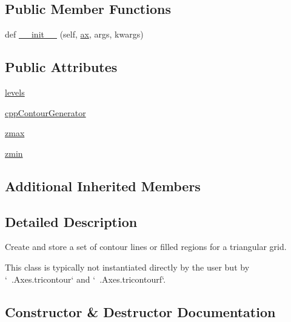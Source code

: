 \subsection*{Public Member Functions}
\begin{DoxyCompactItemize}
\item 
def \hyperlink{classmatplotlib_1_1tri_1_1tricontour_1_1TriContourSet_ade51194772697dd33f8fb16ee7f139f5}{\+\_\+\+\_\+init\+\_\+\+\_\+} (self, \hyperlink{classmatplotlib_1_1contour_1_1ContourSet_a3ae8b3ea504582cfb2b66cc79b932203}{ax}, args, kwargs)
\end{DoxyCompactItemize}
\subsection*{Public Attributes}
\begin{DoxyCompactItemize}
\item 
\hyperlink{classmatplotlib_1_1tri_1_1tricontour_1_1TriContourSet_aaf2cfa8111922a91fbd9c8879c038490}{levels}
\item 
\hyperlink{classmatplotlib_1_1tri_1_1tricontour_1_1TriContourSet_ac7276a16e6f34ebfb5ed63aacec64644}{cpp\+Contour\+Generator}
\item 
\hyperlink{classmatplotlib_1_1tri_1_1tricontour_1_1TriContourSet_afadab997a75ccc2364c967698c62c5f4}{zmax}
\item 
\hyperlink{classmatplotlib_1_1tri_1_1tricontour_1_1TriContourSet_acb38e45bc950186e0608dd8ceedebf2a}{zmin}
\end{DoxyCompactItemize}
\subsection*{Additional Inherited Members}


\subsection{Detailed Description}
\begin{DoxyVerb}Create and store a set of contour lines or filled regions for
a triangular grid.

This class is typically not instantiated directly by the user but by
`~.Axes.tricontour` and `~.Axes.tricontourf`.

\end{DoxyVerb}
 

\subsection{Constructor \& Destructor Documentation}
\mbox{\label{classmatplotlib_1_1tri_1_1tricontour_1_1TriContourSet_ade51194772697dd33f8fb16ee7f139f5}} 
